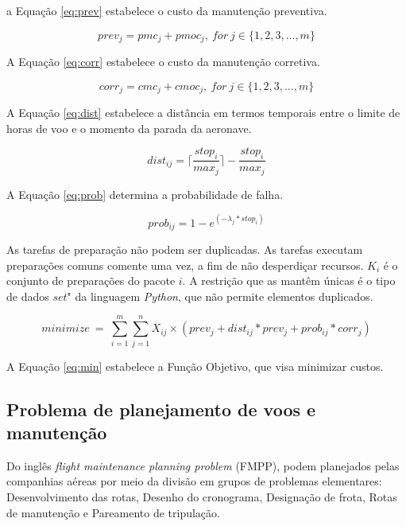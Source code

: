 \documentclass{amsart}
\begin{document}
a Equação \ref{eq:prev} estabelece o custo da manutenção preventiva.

\begin{equation}\label{eq:prev}
prev_j =  pmc_j + pmoc_j,\ for\ j \in \{1, 2, 3, \ldots, m\}
\end{equation}


A Equação \ref{eq:corr} estabelece o custo da manutenção corretiva.

\begin{equation}\label{eq:corr}
corr_j =  cmc_j + cmoc_j,\ for\ j \in \{1, 2, 3, \ldots, m\}
\end{equation}


A Equação  \ref{eq:dist} estabelece a distância em termos temporais entre o limite de horas de voo e o momento da parada da aeronave.

\begin{equation}\label{eq:dist}
dist_{ij} = \lceil{\frac{stop_i}{max_j}}\rceil{}-\frac{stop_i}{max_j} 
\end{equation}


A Equação  \ref{eq:prob} determina a probabilidade de falha.

\begin{equation}\label{eq:prob}
prob_{ij} = 1 - e^{(-\lambda{}_j * stop_i)}
\end{equation}

As tarefas de preparação não podem ser duplicadas. As tarefas executam preparações comuns comente uma vez, a fim de não desperdiçar recursos.
$K_i$ é o conjunto de preparações do pacote $i$. A restrição que as mantêm únicas é o tipo de dados $set$" da linguagem {\it Python}, que não permite elementos duplicados.

\begin{equation} \label{eq:min}
minimize\ =\ \sum_{i=1}^{m} \sum_{j=1}^{n} X_{ij} \times ( prev_j + dist_{ij}*prev_j + prob_{ij}*corr_j )
\end{equation}

A Equação \ref{eq:min} estabelece a Função Objetivo, que visa minimizar custos.


\subsection{Problema de planejamento de voos e manutenção}

Do inglês {\it flight maintenance planning problem} (FMPP), podem planejados pelas companhias aéreas por meio da divisão em grupos de problemas elementares: Desenvolvimento das rotas, Desenho do cronograma, Designação de frota, Rotas de manutenção e Pareamento de tripulação. 
\end{document}
